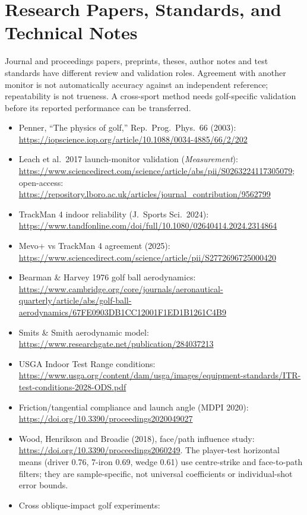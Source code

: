 \section{Research Papers, Standards, and Technical Notes}
Journal and proceedings papers, preprints, theses, author notes and test
standards have different review and validation roles. Agreement with another
monitor is not automatically accuracy against an independent reference;
repeatability is not trueness. A cross-sport method needs golf-specific
validation before its reported performance can be transferred.
\begin{itemize}\small
\item Penner, ``The physics of golf,'' Rep.\ Prog.\ Phys.\ 66 (2003):
  \url{https://iopscience.iop.org/article/10.1088/0034-4885/66/2/202}
\item Leach et al.\ 2017 launch-monitor validation (\emph{Measurement}):
  \url{https://www.sciencedirect.com/science/article/abs/pii/S0263224117305079};
  open-access:
  \url{https://repository.lboro.ac.uk/articles/journal_contribution/9562799}
\item TrackMan 4 indoor reliability (J.\ Sports Sci.\ 2024):
  \url{https://www.tandfonline.com/doi/full/10.1080/02640414.2024.2314864}
\item Mevo+ vs TrackMan 4 agreement (2025):
  \url{https://www.sciencedirect.com/science/article/pii/S2772696725000420}
\item Bearman \& Harvey 1976 golf ball aerodynamics:
  \url{https://www.cambridge.org/core/journals/aeronautical-quarterly/article/abs/golf-ball-aerodynamics/67FE0903DB1CC12001F1ED1B1261C4B9}
\item Smits \& Smith aerodynamic model:
  \url{https://www.researchgate.net/publication/284037213}
\item USGA Indoor Test Range conditions:
  \url{https://www.usga.org/content/dam/usga/images/equipment-standards/ITR-test-conditions-2028-ODS.pdf}
\item Friction/tangential compliance and launch angle (MDPI 2020):
  \url{https://doi.org/10.3390/proceedings2020049027}
\item Wood, Henrikson and Broadie (2018), face/path influence study:
  \url{https://doi.org/10.3390/proceedings2060249}.
  The player-test horizontal means (driver 0.76, 7-iron 0.69, wedge 0.61)
  use centre-strike and face-to-path filters; they are sample-specific,
  not universal coefficients or individual-shot error bounds.
\item Cross oblique-impact golf experiments:

\end{itemize}
